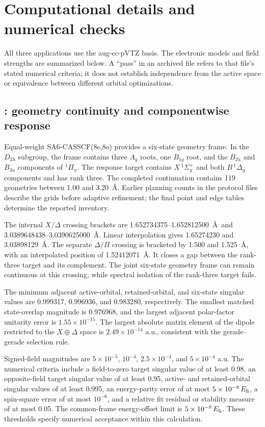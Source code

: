 \documentclass[aip,jcp,amsmath,amssymb,preprint,floatfix]{revtex4-1}
\begin{document}
\section{Computational details and numerical checks}\label{sec:computational}
All three applications use the aug-cc-pVTZ basis. The electronic models and
field strengths are summarized below. A ``pass'' in an archived file refers
to that file's stated numerical criteria; it does not establish independence
from the active space or equivalence between different orbital optimizations.

\subsection{\texorpdfstring{}{C2}: geometry continuity and componentwise response}
Equal-weight SA6-CASSCF(8e,8o) provides a six-state geometry frame. In the
$D_{2h}$ subgroup, the frame contains three $A_g$ roots, one $B_{1g}$ root,
and the $B_{2u}$ and $B_{3u}$ components of $^1\Pi_u$. The response target
contains $X\,{}^1\Sigma_g^+$ and both $B\,{}^1\Delta_g$ components and has
rank three. The completed continuation contains 119 geometries between
1.00 and 3.20~\AA. Earlier planning counts in the protocol files describe
the grids before adaptive refinement; the final point and edge tables
determine the reported inventory.

The internal $X/\Delta$ crossing brackets are
1.652734375--1.652812500~\AA\ and
3.0389648438--3.0390625000~\AA. Linear interpolation gives 1.65274230 and
3.03898129~\AA. The separate $\Delta/\Pi$ crossing is bracketed by
1.500 and 1.525~\AA, with an interpolated position of 1.52412071~\AA.
It closes a gap between the rank-three target and its complement.
The joint six-state geometry frame can remain continuous at this crossing,
while spectral isolation of the rank-three target fails.

The minimum adjacent active-orbital, retained-orbital, and six-state
singular values are 0.999317, 0.996936, and 0.983280, respectively.
The smallest matched state-overlap magnitude is 0.976968, and the largest
adjacent polar-factor unitarity error is $1.55\times10^{-15}$.
The largest absolute matrix element of the dipole restricted to the
$X\oplus\Delta$ space is $2.49\times10^{-14}$ a.u., consistent with
the gerade--gerade selection rule.

Signed-field magnitudes are $5\times10^{-5}$, $10^{-4}$,
$2.5\times10^{-4}$, and $5\times10^{-4}$ a.u. The numerical criteria
include a field-to-zero target singular value of at least 0.98,
an opposite-field target singular value of at least 0.95, active- and
retained-orbital singular values of at least 0.995, an energy-parity error
of at most $5\times10^{-8}\,E_{\mathrm h}$, a spin-square error of at most $10^{-6}$,
and a relative fit residual or stability measure of at most 0.05.
The common-frame energy-offset limit is $5\times10^{-8}\,E_{\mathrm h}$.
These thresholds specify numerical acceptance within this calculation.
\end{document}

